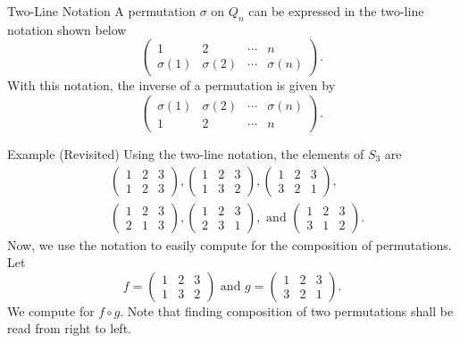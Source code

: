 \documentclass{beamer}
\begin{document}
\begin{frame}{Two-Line Notation}
A permutation $\sigma$ on $Q_n$ can be expressed in the two-line notation shown below
\[
\begin{pmatrix}
1 & 2 & \cdots & n \\
\sigma(1) & \sigma(2) & \cdots & \sigma(n)
\end{pmatrix}.
\]
\pause
With this notation, the inverse of a permutation is given by
\[
\begin{pmatrix}
\sigma(1) & \sigma(2) & \cdots & \sigma(n) \\
1 & 2 & \cdots & n 
\end{pmatrix}.
\]
\end{frame}

\begin{frame}{Example (Revisited)}
\justifying
Using the two-line notation, the elements of $S_3$ are
\begin{align*}
&\begin{pmatrix} 1 & 2 & 3 \\ 1 & 2 & 3 \end{pmatrix}, \begin{pmatrix} 1 & 2 & 3 \\ 1 & 3 & 2 \end{pmatrix},
\begin{pmatrix} 1 & 2 & 3 \\ 3 & 2 & 1 \end{pmatrix}, \\
&\begin{pmatrix} 1 & 2 & 3 \\ 2 & 1 & 3 \end{pmatrix},
\begin{pmatrix} 1 & 2 & 3 \\ 2 & 3 & 1 \end{pmatrix}, \text{ and }
\begin{pmatrix} 1 & 2 & 3 \\ 3 & 1 & 2 \end{pmatrix}.
\end{align*}
\pause
Now, we use the notation to easily compute for the composition of permutations. Let 
\[
f = \begin{pmatrix} 1 & 2 & 3 \\ 1 & 3 & 2 \end{pmatrix} \text{ and } g = \begin{pmatrix} 1 & 2 & 3 \\ 3 & 2 & 1 \end{pmatrix}.
\]
We compute for $f \circ g$. Note that finding composition of two permutations shall be read from right to left.
\end{frame}
\end{document}
